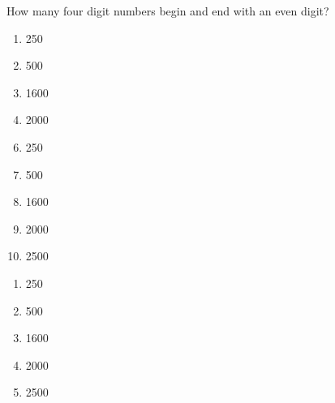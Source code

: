 

   How many four digit numbers begin and end with an even digit?


\ifsat
	\begin{enumerate}[label=\Alph*)]
		\item   250
		\item  500
		\item  1600
		\item  2000%
	\end{enumerate}
\else
\fi

\ifacteven
	\begin{enumerate}[label=\textbf{\Alph*.},itemsep=\fill,align=left]
		\setcounter{enumii}{5}
		\item   250
		\item  500
		\item  1600
		\addtocounter{enumii}{1}
		\item  2000%
		\item  2500
	\end{enumerate}
\else
\fi

\ifactodd
	\begin{enumerate}[label=\textbf{\Alph*.},itemsep=\fill,align=left]
		\item   250
		\item  500
		\item  1600
		\item  2000%
		\item  2500
	\end{enumerate}
\else
\fi

%

\else
\fi

